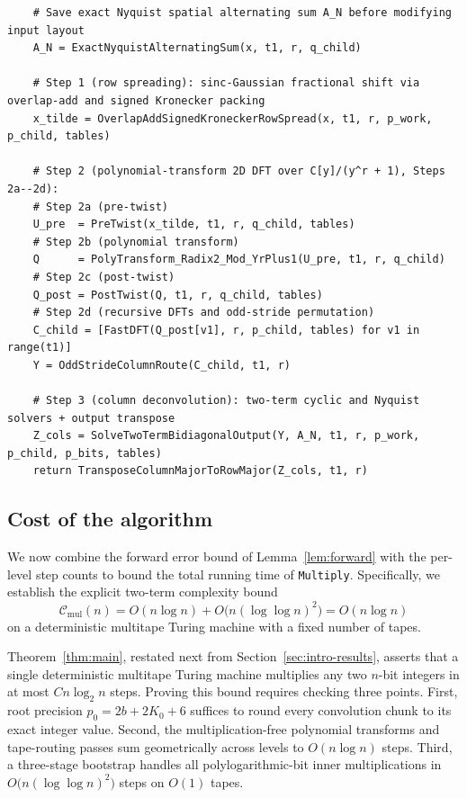 \begin{lstlisting}
    # Save exact Nyquist spatial alternating sum A_N before modifying input layout
    A_N = ExactNyquistAlternatingSum(x, t1, r, q_child)

    # Step 1 (row spreading): sinc-Gaussian fractional shift via overlap-add and signed Kronecker packing
    x_tilde = OverlapAddSignedKroneckerRowSpread(x, t1, r, p_work, p_child, tables)

    # Step 2 (polynomial-transform 2D DFT over C[y]/(y^r + 1), Steps 2a--2d):
    # Step 2a (pre-twist)
    U_pre  = PreTwist(x_tilde, t1, r, q_child, tables)
    # Step 2b (polynomial transform)
    Q      = PolyTransform_Radix2_Mod_YrPlus1(U_pre, t1, r, q_child)
    # Step 2c (post-twist)
    Q_post = PostTwist(Q, t1, r, q_child, tables)
    # Step 2d (recursive DFTs and odd-stride permutation)
    C_child = [FastDFT(Q_post[v1], r, p_child, tables) for v1 in range(t1)]
    Y = OddStrideColumnRoute(C_child, t1, r)

    # Step 3 (column deconvolution): two-term cyclic and Nyquist solvers + output transpose
    Z_cols = SolveTwoTermBidiagonalOutput(Y, A_N, t1, r, p_work, p_child, p_bits, tables)
    return TransposeColumnMajorToRowMajor(Z_cols, t1, r)
\end{lstlisting}

\subsection{Cost of the algorithm}\label{sec:cost-proof}

We now combine the forward error bound of Lemma~\ref{lem:forward} with the per-level step counts to bound the total running time of \texttt{Multiply}. Specifically, we establish the explicit two-term complexity bound
\begin{equation}\label{eq:main-bound}
  \mathcal{C}_{\mathrm{mul}}(n) = O(n \log n) + O\bigl(n (\log \log n)^2\bigr) = O(n \log n)
\end{equation}
on a deterministic multitape Turing machine with a fixed number of tapes.

Theorem~\ref{thm:main}, restated next from Section~\ref{sec:intro-results}, asserts that a single deterministic multitape Turing machine multiplies any two $n$-bit integers in at most $C n \log_2 n$ steps. Proving this bound requires checking three points. First, root precision $p_0 = 2b + 2K_0 + 6$ suffices to round every convolution chunk to its exact integer value. Second, the multiplication-free polynomial transforms and tape-routing passes sum geometrically across levels to $O(n \log n)$ steps. Third, a three-stage bootstrap handles all polylogarithmic-bit inner multiplications in $O\bigl(n (\log \log n)^2\bigr)$ steps on $O(1)$ tapes.

